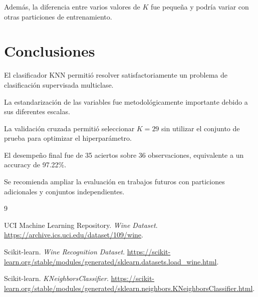 ﻿\documentclass[11pt,a4paper]{article}
\begin{document}
Además, la diferencia entre varios valores
de $K$ fue pequeña y podría variar con
otras particiones de entrenamiento.

\section{Conclusiones}

El clasificador KNN permitió resolver
satisfactoriamente un problema de
clasificación supervisada multiclase.

La estandarización de las variables
fue metodológicamente importante
debido a sus diferentes escalas.

La validación cruzada permitió seleccionar
$K=29$ sin utilizar el conjunto de prueba
para optimizar el hiperparámetro.

El desempeño final fue de 35 aciertos
sobre 36 observaciones, equivalente
a un accuracy de 97.22\%.

Se recomienda ampliar la evaluación
en trabajos futuros con particiones
adicionales y conjuntos independientes.

\begin{thebibliography}{9}

UCI Machine Learning Repository.
\textit{Wine Dataset}.
\url{https://archive.ics.uci.edu/dataset/109/wine}.

Scikit-learn.
\textit{Wine Recognition Dataset}.
\url{https://scikit-learn.org/stable/modules/generated/sklearn.datasets.load_wine.html}.

Scikit-learn.
\textit{KNeighborsClassifier}.
\url{https://scikit-learn.org/stable/modules/generated/sklearn.neighbors.KNeighborsClassifier.html}.

\end{thebibliography}
\end{document}
